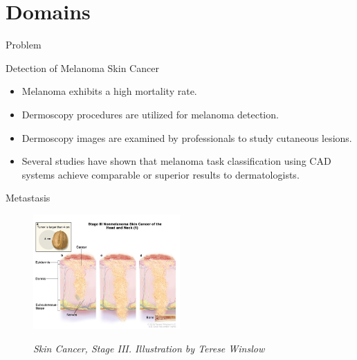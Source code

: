 \documentclass[dvipsnames,mathserif]{beamer}
\begin{document}
{\begin{frame}
    \end{frame}

    \section{Domains}

    \begin{frame}
      \begin{center}
        \Huge Problem
      \end{center}
    \end{frame}


    \begin{frame}
      \large Detection of Melanoma Skin Cancer
      \vspace{0.25cm}

      \footnotesize
      \begin{itemize}
        \item Melanoma exhibits a high mortality rate.
        \item Dermoscopy procedures are utilized for melanoma detection.
        \item Dermoscopy images are examined by professionals to study cutaneous lesions.
        \item Several studies have shown that melanoma task classification
          using CAD systems achieve comparable or superior results to
          dermatologists.
      \end{itemize}


    \end{frame}



    \begin{frame}

    \large Metastasis
      \vspace{0.25cm}

      \footnotesize
    \begin{figure}[H] \centering
      \includegraphics[width=0.5\textwidth]{images/stage3-skin-cancer.jpg}
      \caption[Skin Cancer, Stage III]{\textit{Skin Cancer, Stage III. Illustration by
    Terese Winslow}} {\label{fig:stage3-skin-canceer}} \end{figure}


\end{frame}}
\end{document}
